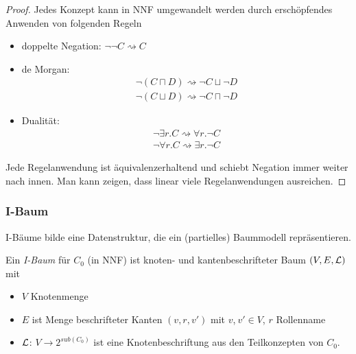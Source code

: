 \begin{tafel}

    \begin{proof}
        Jedes Konzept kann in NNF umgewandelt werden durch erschöpfendes Anwenden von folgenden Regeln
        \begin{itemize}
            \item doppelte Negation: $\neg \neg C \rightsquigarrow C$
            \item de Morgan: \begin{align*}
                    \neg (C \sqcap D) \rightsquigarrow \neg C \sqcup \neg D\\
                    \neg (C \sqcup D) \rightsquigarrow \neg C \sqcap \neg D
                \end{align*}
            \item Dualität: \begin{align*}
                    \neg \exists r.C \rightsquigarrow \forall r.\neg C\\
                    \neg \forall r.C \rightsquigarrow \exists r.\neg C
                \end{align*}
        \end{itemize}
        Jede Regelanwendung ist äquivalenzerhaltend und schiebt Negation immer
        weiter nach innen. Man kann zeigen, dass linear viele Regelanwendungen
        ausreichen.
    \end{proof}
\end{tafel}


\subsubsection{I-Baum}\label{i-baum}

I-Bäume bilde eine Datenstruktur, die ein (partielles) Baummodell
repräsentieren.

\begin{definition}[I-Baum]

Ein \emph{I-Baum} für $C_{0}$ (in NNF) ist knoten- und kantenbeschrifteter
Baum $\left( V,E,\ML \right)$ mit

\begin{itemize}
\item $V$ Knotenmenge
\item $E$ ist Menge beschrifteter Kanten $\left( v,r,v' \right)$ mit
  $v$,$\ v' \in V$, $r$ Rollenname
\item $\mathcal{L}$: $V \rightarrow 2^{sub(C_{0})}$ ist eine Knotenbeschriftung aus den Teilkonzepten von $C_0$.
\end{itemize}
\end{definition}

